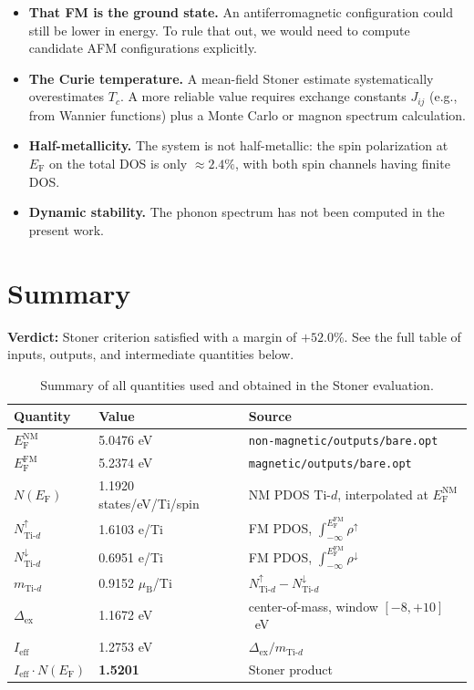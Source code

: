 \documentclass[11pt,a4paper]{article}
\newcommand{\Ef}{E_{\mathrm{F}}}
\newcommand{\Tid}{\text{Ti-}d}
\newcommand{\rhoup}{\rho^{\uparrow}}
\newcommand{\rhodn}{\rho^{\downarrow}}
\newcommand{\Dex}{\Delta_{\text{ex}}}
\newcommand{\Ieff}{I_{\text{eff}}}
\newcommand{\NEf}{N(\Ef)}
\begin{document}
\begin{itemize}[itemsep=2pt]
    \item \textbf{That FM is the ground state.} An antiferromagnetic
          configuration could still be lower in energy. To rule that
          out, we would need to compute candidate AFM configurations
          explicitly.
    \item \textbf{The Curie temperature.} A mean-field Stoner estimate
          systematically overestimates $T_c$. A more reliable value
          requires exchange constants $J_{ij}$ (e.g., from Wannier
          functions) plus a Monte Carlo or magnon spectrum calculation.
    \item \textbf{Half-metallicity.} The system is not half-metallic:
          the spin polarization at $\Ef$ on the total DOS is only
          $\approx 2.4\%$, with both spin channels having finite DOS.
    \item \textbf{Dynamic stability.} The phonon spectrum has not been
          computed in the present work.
\end{itemize}

\section{Summary}

\noindent\textbf{Verdict:} Stoner criterion satisfied with a margin of
$+52.0\%$. See the full table of inputs, outputs, and intermediate
quantities below.

\begin{table}[h!]
	\centering
	\small
	\renewcommand{\arraystretch}{1.5}
	\begin{tabular}{l l l}
		\toprule
		Quantity                & Value                & Source \\
		\midrule
		$\Ef^{\text{NM}}$       & 5.0476 eV            & \texttt{non-magnetic/outputs/bare.opt} \\
		$\Ef^{\text{FM}}$       & 5.2374 eV            & \texttt{magnetic/outputs/bare.opt} \\
		$\NEf$                  & 1.1920 states/eV/Ti/spin & NM PDOS Ti-$d$, interpolated at $\Ef^{\text{NM}}$ \\
		$N^{\uparrow}_{\Tid}$   & 1.6103 e/Ti          & FM PDOS, $\int_{-\infty}^{\Ef^{\text{FM}}}\rhoup$ \\
		$N^{\downarrow}_{\Tid}$ & 0.6951 e/Ti          & FM PDOS, $\int_{-\infty}^{\Ef^{\text{FM}}}\rhodn$ \\
		$m_{\Tid}$              & 0.9152 $\mu_{\text{B}}$/Ti & $N^{\uparrow}_{\Tid} - N^{\downarrow}_{\Tid}$ \\
		$\Dex$                  & 1.1672 eV            & center-of-mass, window $[-8, +10]$~eV \\
		$\Ieff$                 & 1.2753 eV            & $\Dex / m_{\Tid}$ \\
		$\Ieff \cdot \NEf$      & \textbf{1.5201}      & Stoner product \\
		\bottomrule
	\end{tabular}
	\caption{Summary of all quantities used and obtained in the Stoner
		evaluation.}
\end{table}
\end{document}
